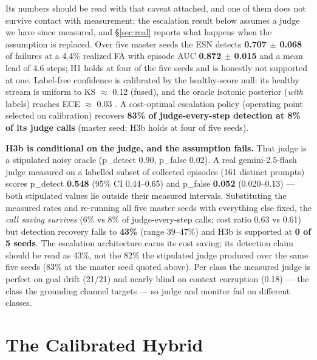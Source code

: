 \documentclass{article}
\begin{document}
Its numbers should be read with that caveat attached, and one of them does not survive contact with measurement: the escalation result below assumes a judge we have since measured, and \S\ref{sec:real} reports what happens when the assumption is replaced. Over five master seeds the ESN detects \textbf{0.707 $\pm$ 0.068} of failures at a 4.4\% realized FA with episode AUC \textbf{0.872 $\pm$ 0.015} and a mean lead of 4.6 steps; H1 holds at four of the five seeds and is honestly not supported at one. Label-free confidence is calibrated by the healthy-score null: its healthy stream is uniform to KS $\approx$ 0.12 (fused), and the oracle isotonic posterior (\emph{with} labels) reaches ECE $\approx$ 0.03 \cite{guo2017calibration}. A cost-optimal escalation policy (operating point selected on calibration) recovers \textbf{83\% of judge-every-step detection at 8\% of its judge calls} (master seed; H3b holds at four of five seeds).

\textbf{H3b is conditional on the judge, and the assumption fails.} That judge is a stipulated noisy oracle (p\_detect 0.90, p\_false 0.02). A real gemini-2.5-flash judge measured on a labelled subset of collected episodes (161 distinct prompts) scores p\_detect \textbf{0.548} (95\% CI 0.44--0.65) and p\_false \textbf{0.052} (0.020--0.13) --- both stipulated values lie outside their measured intervals. Substituting the measured rates and re-running all five master seeds with everything else fixed, the \emph{call saving survives} (6\% vs 8\% of judge-every-step calls; cost ratio 0.63 vs 0.61) but detection recovery falls to \textbf{43\%} (range 39--47\%) and H3b is supported at \textbf{0 of 5 seeds}. The escalation architecture earns its cost saving; its detection claim should be read as 43\%, not the 82\% the stipulated judge produced over the same five seeds (83\% at the master seed quoted above). Per class the measured judge is perfect on goal drift (21/21) and nearly blind on context corruption (0.18) --- the class the grounding channel targets --- so judge and monitor fail on different classes.





\section{The Calibrated Hybrid}
\end{document}
